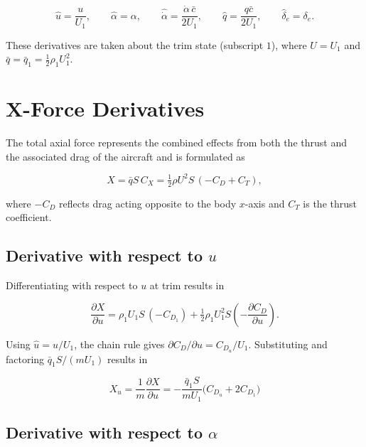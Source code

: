 \documentclass[11pt]{article}
\newcommand{\qbar}{\bar{q}}
\newcommand{\cbar}{\bar{c}}
\newcommand{\dd}[2]{\dfrac{\partial #1}{\partial #2}}
\begin{document}
\begin{equation}\label{eq:equation_2}
\hat{u} = \frac{u}{U_1}, \qquad
\hat{\alpha} = \alpha, \qquad
\hat{\dot\alpha} = \frac{\dot\alpha\,\cbar}{2U_1}, \qquad
\hat{q} = \frac{q\cbar}{2U_1}, \qquad
\hat{\delta}_e = \delta_e .
\end{equation}

These derivatives are taken about the trim state (subscript $1$), where $U = U_1$
and $\qbar = \qbar_1 = \tfrac{1}{2}\rho_1 U_1^2$.

\section{X-Force Derivatives}

The total axial force represents the combined effects from both the thrust and the associated drag of the aircraft and
is formulated as

\begin{equation}\label{eq:equation_3}
X = \qbar S\,C_X = \tfrac{1}{2}\rho U^2 S\,(-C_D + C_T),
\end{equation}

where $-C_D$ reflects drag acting opposite to the body $x$-axis and $C_T$ is the
thrust coefficient.

\subsection{Derivative with respect to $u$}

Differentiating with respect to $u$ at trim results in

\begin{equation}\label{eq:equation_4}
\dd{X}{u} = \rho_1 U_1 S\,(-C_{D_1}) + \tfrac{1}{2}\rho_1 U_1^2 S\left(-\dd{C_D}{u}\right).
\end{equation}

Using $\hat u = u/U_1$, the chain rule gives $\partial C_D/\partial u = C_{D_u}/U_1$.
Substituting and factoring $\qbar_1 S/(mU_1)$ results in

\begin{equation}\label{eq:equation_5}
\boxed{\;X_u = \frac{1}{m}\dd{X}{u} = -\frac{\qbar_1 S}{mU_1}\bigl(C_{D_u} + 2C_{D_1}\bigr)\;}
\end{equation}

\subsection{Derivative with respect to $\alpha$}
\end{document}

